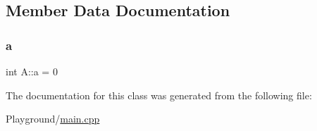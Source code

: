\subsection{Member Data Documentation}
\mbox{\label{class_a_a49a53415abd8f1b26235579cc805a15f}} 
\subsubsection{\texorpdfstring{a}{a}}
{\footnotesize\ttfamily int A\+::a = 0}



The documentation for this class was generated from the following file\+:\begin{DoxyCompactItemize}
\item 
Playground/\mbox{\hyperlink{_playground_2main_8cpp}{main.\+cpp}}\end{DoxyCompactItemize}
